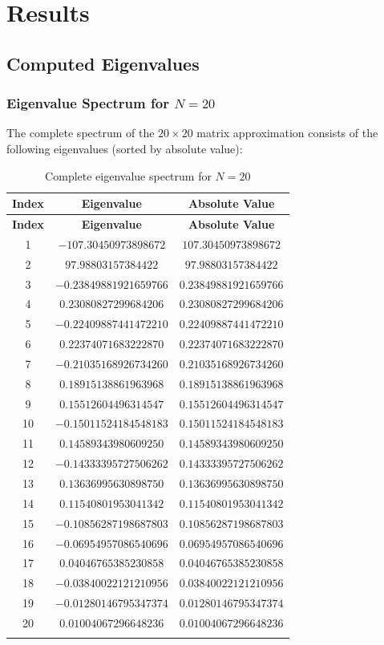\documentclass[12pt,letterpaper]{article}
\theoremstyle{plain}
\theoremstyle{definition}
\theoremstyle{remark}
\begin{document}
\section{Results}

\subsection{Computed Eigenvalues}

\subsubsection{Eigenvalue Spectrum for $N = 20$}

The complete spectrum of the $20 \times 20$ matrix approximation consists of the following eigenvalues (sorted by absolute value):

\begin{longtable}{|c|c|c|}
\hline
\textbf{Index} & \textbf{Eigenvalue} & \textbf{Absolute Value} \\
\hline
\endfirsthead
\hline
\textbf{Index} & \textbf{Eigenvalue} & \textbf{Absolute Value} \\
\hline
\endhead
1 & $-107.30450973898672$ & $107.30450973898672$ \\
2 & $97.98803157384422$ & $97.98803157384422$ \\
3 & $-0.23849881921659766$ & $0.23849881921659766$ \\
4 & $0.23080827299684206$ & $0.23080827299684206$ \\
5 & $-0.22409887441472210$ & $0.22409887441472210$ \\
6 & $0.22374071683222870$ & $0.22374071683222870$ \\
7 & $-0.21035168926734260$ & $0.21035168926734260$ \\
8 & $0.18915138861963968$ & $0.18915138861963968$ \\
9 & $0.15512604496314547$ & $0.15512604496314547$ \\
10 & $-0.15011524184548183$ & $0.15011524184548183$ \\
11 & $0.14589343980609250$ & $0.14589343980609250$ \\
12 & $-0.14333395727506262$ & $0.14333395727506262$ \\
13 & $0.13636995630898750$ & $0.13636995630898750$ \\
14 & $0.11540801953041342$ & $0.11540801953041342$ \\
15 & $-0.10856287198687803$ & $0.10856287198687803$ \\
16 & $-0.06954957086540696$ & $0.06954957086540696$ \\
17 & $0.04046765385230858$ & $0.04046765385230858$ \\
18 & $-0.03840022121210956$ & $0.03840022121210956$ \\
19 & $-0.01280146795347374$ & $0.01280146795347374$ \\
20 & $0.01004067296648236$ & $0.01004067296648236$ \\
\hline
\caption{Complete eigenvalue spectrum for $N = 20$}
\end{longtable}
\end{document}
